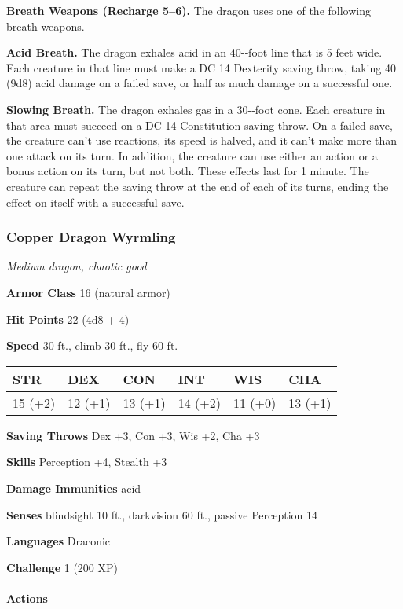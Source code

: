 \documentclass[
]{article}
\begin{document}
\textbf{Breath Weapons (Recharge 5--6).} The dragon uses one of the
following breath weapons.

\textbf{Acid Breath.} The dragon exhales acid in an 40-­‐foot line that
is 5 feet wide. Each creature in that line must make a DC 14 Dexterity
saving throw, taking 40 (9d8) acid damage on a failed save, or half as
much damage on a successful one.

\textbf{Slowing Breath.} The dragon exhales gas in a 30-­‐foot cone.
Each creature in that area must succeed on a DC 14 Constitution saving
throw. On a failed save, the creature can't use reactions, its speed is
halved, and it can't make more than one attack on its turn. In addition,
the creature can use either an action or a bonus action on its turn, but
not both. These effects last for 1 minute. The creature can repeat the
saving throw at the end of each of its turns, ending the effect on
itself with a successful save.

\hypertarget{copper-dragon-wyrmling}{%
\subsubsection{Copper Dragon Wyrmling}\label{copper-dragon-wyrmling}}

\emph{Medium dragon, chaotic good}

\textbf{Armor Class} 16 (natural armor)

\textbf{Hit Points} 22 (4d8 + 4)

\textbf{Speed} 30 ft., climb 30 ft., fly 60 ft.

\begin{longtable}[]{@{}llllll@{}}
\toprule
STR & DEX & CON & INT & WIS & CHA\tabularnewline
\midrule
\endhead
15 (+2) & 12 (+1) & 13 (+1) & 14 (+2) & 11 (+0) & 13 (+1)\tabularnewline
\bottomrule
\end{longtable}

\textbf{Saving Throws} Dex +3, Con +3, Wis +2, Cha +3

\textbf{Skills} Perception +4, Stealth +3

\textbf{Damage Immunities} acid

\textbf{Senses} blindsight 10 ft., darkvision 60 ft., passive Perception
14

\textbf{Languages} Draconic

\textbf{Challenge} 1 (200 XP)

\hypertarget{actions-54}{%
\paragraph{Actions}\label{actions-54}}
\end{document}
